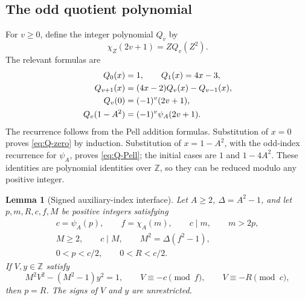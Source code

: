 \documentclass[11pt,a4paper]{article}
\newtheorem{lemma}[theorem]{Lemma}
\theoremstyle{definition}
\newcommand{\Z}{\mathbb Z}
\begin{document}
\subsection{The odd quotient polynomial}

For \(v\ge0\), define the integer polynomial \(Q_v\) by
\[
 \chi_Z(2v+1)=ZQ_v(Z^2).
\]
The relevant formulas are
\begin{align}
 Q_0(x)&=1,\qquad Q_1(x)=4x-3, \notag\\
 Q_{v+1}(x)&=(4x-2)Q_v(x)-Q_{v-1}(x),\label{eq:Q-recurrence}\\
 Q_v(0)&=(-1)^v(2v+1),\label{eq:Q-zero}\\
 Q_v(1-A^2)&=(-1)^v\psi_A(2v+1).\label{eq:Q-Pell}
\end{align}
The recurrence follows from the Pell addition formulas.  Substitution
of \(x=0\) proves \eqref{eq:Q-zero} by induction.  Substitution of
\(x=1-A^2\), with the odd-index recurrence for \(\psi_A\), proves
\eqref{eq:Q-Pell}; the initial cases are \(1\) and \(1-4A^2\).
These identities are polynomial identities over \(\Z\), so they can
be reduced modulo any positive integer.

\begin{lemma}[Signed auxiliary-index interface]
\label{lem:signed-aux}
Let \(A\ge2\), \(\Delta=A^2-1\), and let
\(p,m,R,c,f,M\) be positive integers satisfying
\begin{gather*}
 c=\psi_A(p),\qquad f=\chi_A(m),\qquad c\mid m,\qquad m>2p,\\
 M\ge2,\qquad c\mid M,\qquad M^2=\Delta(f^2-1),\\
 0<p<c/2,\qquad 0<R<c/2.
\end{gather*}
If \(V,y\in\Z\) satisfy
\begin{equation}
 M^2V^2-(M^2-1)y^2=1,\qquad
 V\equiv-c\pmod f,\qquad V\equiv-R\pmod c,
 \label{eq:aux-interface}
\end{equation}
then \(p=R\).  The signs of \(V\) and \(y\) are unrestricted.
\end{lemma}
\end{document}
